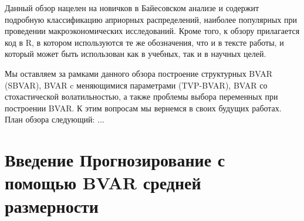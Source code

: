 \documentclass[11pt]{article} %
\begin{document}
Данный обзор нацелен на новичков в Байесовском анализе и содержит подробную классификацию априорных распределений, наиболее популярных при проведении макроэкономических исследований. Кроме того, к обзору прилагается код в R, в котором используются те же обозначения, что и в тексте работы, и который может быть использован как в учебных, так и в научных целей. 

Мы оставляем за рамками данного обзора построение структурных BVAR (SBVAR), BVAR c меняющимися параметрами (TVP-BVAR), BVAR со стохастической волатильностью, а также проблемы выбора переменных при построении BVAR. К этим вопросам мы вернемся в своих будущих работах. 
 План обзора следующий: ...




\section{Введение Прогнозирование с помощью BVAR средней размерности }
\end{document}
